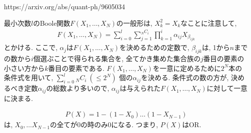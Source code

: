 \begin{ex}
    \label{ex6.17}
    https://arxiv.org/abs/quant-ph/9605034
\end{ex}
\begin{ex}
    \label{ex6.18}
    最小次数$l$のBoole関数$F({X_1, \dots, X_N})$の一般形は, $X_k^2 = X_k$なことに注意して,
    \begin{align*}
        F({X_1, \dots, X_N}) = \sum_{i = 0}^l \sum_{j=1}^{_N C _i}  \prod_{k=1}^i \alpha_{ij} X_{\beta_{ijk}}
    \end{align*}
    とかける. ここで, $\alpha_j$は$F({X_1, \dots, X_N})$を決めるための定数で, $\beta_{ijk}$は, 1から$n$までの数から$i$個選ぶことで得られる集合を, 全てかき集めた集合族の$j$番目の要素の小さい方から$k$番目の要素である. $F({X_1, \dots, X_N})$を一意に定めるために$2^N$本の条件式を用いて,
    $\sum_{i=0}^{l} {}_N C_i \ (\leq 2^N)$
    個の$\alpha_{ij}$を決める. 条件式の数の方が, 決めるべき定数$\alpha_{ij}$の総数より多いので, $\alpha_{ij}$は与えられた$F({X_1, \dots, X_N})$に対して一意に決まる.
\end{ex}

\begin{ex}
    \label{ex6.19}
    \begin{align*}
        P(X) = 1 - (1 - X_0) \dots (1-X_{N-1})
    \end{align*}
    は, $X_0, \dots X_{N-1}$の全てが0の時のみ0になる. つまり, $P(X)$はOR.
\end{ex}